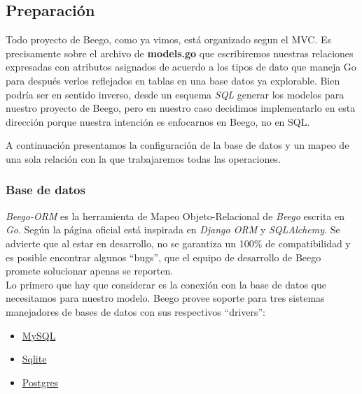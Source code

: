\documentclass[12pt]{article}
\begin{document}
\subsection{Preparación}
Todo proyecto de Beego, como ya vimos, está organizado segun el MVC. Es precisamente
sobre el archivo de \textbf{models.go} que escribiremos nuestras
relaciones expresadas con atributos asignados de acuerdo a los tipos de dato
que maneja Go para después verlos reflejados en tablas en una base datos ya explorable.
Bien podría ser en sentido inverso, desde un esquema \textit{SQL} generar los modelos
para nuestro proyecto de Beego, pero en nuestro caso decidimos implementarlo
en esta dirección porque nuestra intención es enfocarnos en Beego, no en SQL.\par
A continuación presentamos la configuración de la base de datos y un mapeo
de una sola relación con la que trabajaremos todas las operaciones.
\subsubsection*{Base de datos}
\textit{Beego-ORM} es la herramienta de Mapeo Objeto-Relacional de \textit{Beego}
escrita en \textit{Go}. Según la página oficial está inspirada en \textit{Django ORM}
y \textit{SQLAlchemy}. Se advierte que al estar en desarrollo, no se garantiza
un 100\% de compatibilidad y es posible encontrar algunos ``bugs'', que el
equipo de desarrollo de Beego promete solucionar apenas se reporten.\\

Lo primero que hay que considerar es la conexión con la base de datos que necesitamos para nuestro modelo.
Beego provee soporte para tres sistemas manejadores de bases de datos
con sus respectivos ``drivers'':
\begin{itemize}
\item \href{http://www.mysql.com/}{MySQL}
\item \href{https://sqlite.org/}{Sqlite}
\item \href{http://www.postgresql.org.es/}{Postgres}
\end{itemize}
\end{document}
